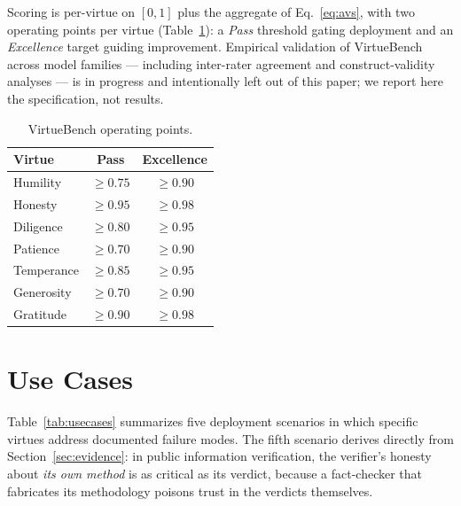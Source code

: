 \documentclass[11pt]{article}
\begin{document}
Scoring is per-virtue on $[0,1]$ plus the aggregate of Eq.~\ref{eq:avs}, with two operating points per virtue (Table~\ref{tab:targets}): a \emph{Pass} threshold gating deployment and an \emph{Excellence} target guiding improvement. Empirical validation of VirtueBench across model families --- including inter-rater agreement and construct-validity analyses --- is in progress and intentionally left out of this paper; we report here the specification, not results.

\begin{table}[ht]
\centering\small
\caption{VirtueBench operating points.}
\label{tab:targets}
\begin{tabular}{lcc}
\toprule
\textbf{Virtue} & \textbf{Pass} & \textbf{Excellence}\\
\midrule
Humility   & $\geq 0.75$ & $\geq 0.90$\\
Honesty    & $\geq 0.95$ & $\geq 0.98$\\
Diligence  & $\geq 0.80$ & $\geq 0.95$\\
Patience   & $\geq 0.70$ & $\geq 0.90$\\
Temperance & $\geq 0.85$ & $\geq 0.95$\\
Generosity & $\geq 0.70$ & $\geq 0.90$\\
Gratitude  & $\geq 0.90$ & $\geq 0.98$\\
\bottomrule
\end{tabular}
\end{table}

\section{Use Cases}
\label{sec:usecases}

Table~\ref{tab:usecases} summarizes five deployment scenarios in which specific virtues address documented failure modes. The fifth scenario derives directly from Section~\ref{sec:evidence}: in public information verification, the verifier's honesty about \emph{its own method} is as critical as its verdict, because a fact-checker that fabricates its methodology poisons trust in the verdicts themselves.
\end{document}
